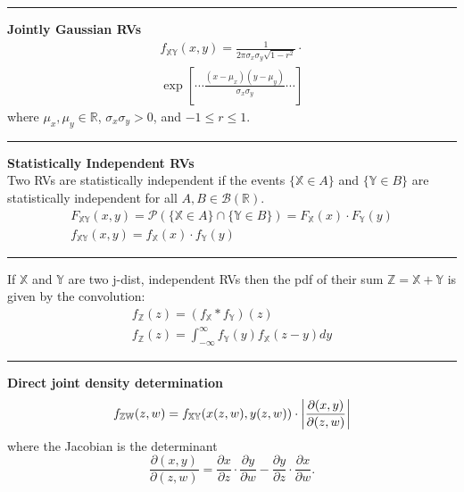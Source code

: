 \documentclass{article}
\DeclarePairedDelimiter\abs{\lvert}{\rvert}
\renewcommand{\P}{\mathcal{P}}
\providecommand{\B}{\mathcal{B}}
\providecommand{\X}{\mathbb{X}}
\providecommand{\Y}{\mathbb{Y}}
\providecommand{\Z}{\mathbb{Z}}
\providecommand{\W}{\mathbb{W}}
\providecommand{\R}{\mathbb{R}}
\begin{document}
\begin{multicols*}{3}
        \noindent\rule{\columnwidth}{0.4pt}

        \textbf{Jointly Gaussian RVs}
        \begin{equation*}
            \begin{gathered}
                f_{\X\Y}(x,y) = \frac{1}{2\pi \sigma_x \sigma_y \sqrt{1-r^2}}\cdot\\
                \exp{[\cdots\frac{(x-\mu_x)(y-\mu_y)}{\sigma_x \sigma_y}\cdots]}
            \end{gathered}
        \end{equation*}
        where $\mu_x,\mu_y\in\R$, $\sigma_x \sigma_y>0$, and $-1\leq r\leq1$.\\

        \noindent\rule{\columnwidth}{0.4pt}

        \textbf{Statistically Independent RVs}\\
        Two RVs are statistically independent if the events $\{\X\in A\}$ and $\{\Y\in B\}$ are statistically independent for all $A,B\in \B(\R)$.
        \begin{equation*}
            \begin{gathered}
                F_{\X\Y}(x,y) = \P(\{\X\in A\}\cap\{\Y\in B\}) = F_{\X}(x)\cdot F_{\Y}(y)\\
                f_{\X\Y}(x,y) = f_{\X}(x)\cdot f_{\Y}(y)
            \end{gathered}
        \end{equation*}

        \noindent\rule{\columnwidth}{0.4pt}

        If $\X$ and $\Y$ are two j-dist, independent RVs then the pdf of their sum $\Z=\X+\Y$ is given by the convolution:
        \begin{equation*}
            \begin{gathered}
                f_{\Z}(z) = (f_\X * f_\Y)(z)\\
                f_{\Z}(z) = \int_{-\infty}^{\infty} f_{\Y}(y)f_{\X}(z-y)dy
            \end{gathered}
        \end{equation*}

        \noindent\rule{\columnwidth}{0.4pt}

        \textbf{Direct joint density determination}
        \begin{equation*}
            f_{\Z\W}(z,w)= f_{\X\Y}(x(z,w),y(z,w))\cdot\abs*{\frac{\partial (x,y)}{\partial (z,w)}}
        \end{equation*}
        where the Jacobian is the determinant
        \begin{equation*}
            \frac{\partial (x,y)}{\partial (z,w)} = \frac{\partial x}{\partial z}\cdot \frac{\partial y}{\partial w} - \frac{\partial y}{\partial z}\cdot \frac{\partial x}{\partial w}.
        \end{equation*}


\end{multicols*}
\end{document}
